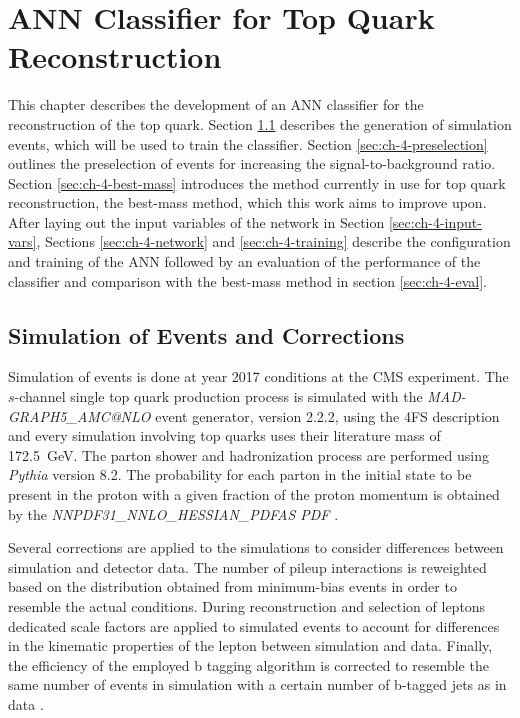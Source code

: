 \chapter{ANN Classifier for Top Quark Reconstruction}
\label{ch:classifier}

This chapter describes the development of an ANN classifier for the reconstruction of the top quark.
Section \ref{sec:ch-4-simulation} describes the generation of simulation events, which will be used to train the classifier. Section \ref{sec:ch-4-preselection} outlines the preselection of events for increasing the signal-to-background ratio. Section \ref{sec:ch-4-best-mass} introduces the method currently in use for top quark reconstruction, the best-mass method, which this work aims to improve upon. After laying out the input variables of the network in Section \ref{sec:ch-4-input-vars}, Sections \ref{sec:ch-4-network} and \ref{sec:ch-4-training} describe the configuration and training of the ANN followed by an evaluation of the performance of the classifier and comparison with the best-mass method in section \ref{sec:ch-4-eval}.

\section{Simulation of Events and Corrections}
\label{sec:ch-4-simulation}
Simulation of events is done at year 2017 conditions at the CMS experiment. The $s$-channel single top quark production process is simulated with the \emph{MAD-GRAPH5\_AMC@NLO} event generator, version 2.2.2, using the 4FS description \cite{2009JHEPA} and every simulation involving top quarks uses their literature mass of \SI{172.5}{GeV}. The parton shower and hadronization process are performed using \emph{Pythia} version 8.2. The probability for each parton in the initial state to be present in the proton with a given fraction of the proton momentum is obtained by the \emph{NNPDF31\_NNLO\_HESSIAN\_PDFAS PDF} \cite{2015CoPhC.191.159S}.

Several corrections are applied to the simulations to consider differences between simulation and detector data. The number of pileup interactions is reweighted based on the distribution obtained from minimum-bias events in order to resemble the actual conditions. During reconstruction and selection of leptons dedicated scale factors are applied to simulated events to account for differences in the kinematic properties of the lepton between simulation and data. Finally, the efficiency of the employed b tagging algorithm is corrected to resemble the same number of events in simulation with a certain number of b-tagged jets as in data \cite{CMS-b-tagging}.

